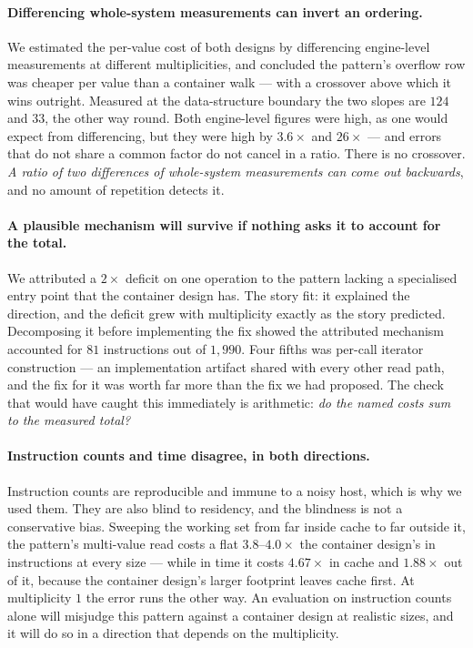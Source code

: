 \documentclass[11pt,a4paper]{article}
\theoremstyle{plain}
\theoremstyle{definition}
\theoremstyle{remark}
\begin{document}
\paragraph{Differencing whole-system measurements can invert an ordering.}
We estimated the per-value cost of both designs by differencing engine-level
measurements at different multiplicities, and concluded the pattern's overflow
row was cheaper per value than a container walk --- with a crossover above
which it wins outright. Measured at the data-structure boundary the two slopes
are $124$ and $33$, the other way round. Both engine-level figures were high,
as one would expect from differencing, but they were high by $3.6\times$ and
$26\times$ --- and errors that do not share a common factor do not cancel in a
ratio. There is no crossover. \emph{A ratio of two differences of whole-system
measurements can come out backwards}, and no amount of repetition detects it.

\paragraph{A plausible mechanism will survive if nothing asks it to account for
the total.} We attributed a $2\times$ deficit on one operation to the pattern
lacking a specialised entry point that the container design has. The story
fit: it explained the direction, and the deficit grew with
multiplicity exactly as the story predicted. Decomposing it before implementing
the fix showed the attributed mechanism accounted for $81$ instructions out of
$1{,}990$. Four fifths was per-call iterator construction --- an implementation
artifact shared with every other read path, and the fix for it was worth far
more than the fix we had proposed. The check that would have caught this
immediately is arithmetic: \emph{do the named costs sum to the measured total?}

\paragraph{Instruction counts and time disagree, in both directions.}
Instruction counts are reproducible and immune to a noisy host, which is why we
used them. They are also blind to residency, and the blindness is not a
conservative bias. Sweeping the working set from far inside cache to far
outside it, the pattern's multi-value read costs a flat $3.8$--$4.0\times$ the
container design's in instructions at every size --- while in time it costs
$4.67\times$ in cache and $1.88\times$ out of it, because the container
design's larger footprint leaves cache first. At multiplicity $1$ the error
runs the other way. An evaluation on instruction counts alone will misjudge
this pattern against a container design at realistic sizes, and it will do so
in a direction that depends on the multiplicity.
\end{document}
